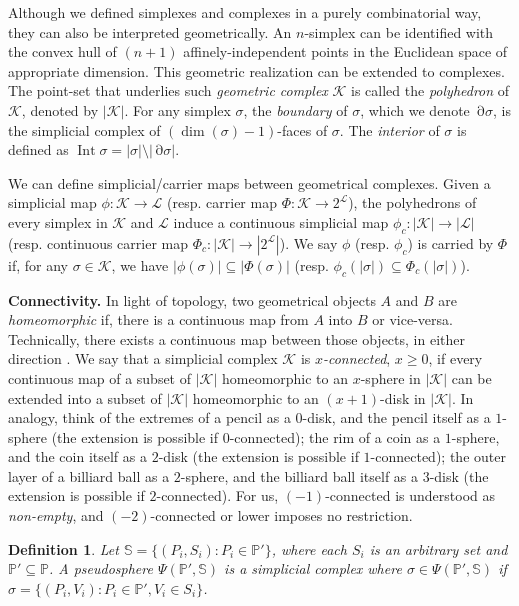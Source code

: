 \documentclass[11pt]{article}
\newcommand{\cK}{\ensuremath{\mathcal{K}}}
\newcommand{\cL}{\ensuremath{\mathcal{L}}}
\newcommand{\bbP}{\ensuremath{\mathbb{P}}}
\newcommand{\bbS}{\ensuremath{\mathbb{S}}}
\DeclareMathOperator{\Bd}{\partial}
\DeclareMathOperator{\inte}{Int}
\newtheorem{definition}[theorem]{Definition}
\newcommand{\set}[1]{\{#1\}}
\begin{document}
Although we defined simplexes and complexes in a purely combinatorial way,
they can also be interpreted geometrically.
An $n$-simplex can be identified with the convex hull of $(n+1)$
affinely-independent points in the Euclidean space of appropriate dimension.
This geometric realization can be extended to complexes.
The point-set that underlies such \emph{geometric complex} $\cK$ is called
the \emph{polyhedron} of $\cK$, denoted by $|\cK|$.
For any simplex $\sigma$, the \emph{boundary} of $\sigma$, which we denote $\Bd{\sigma}$,
is the simplicial complex of $(\dim(\sigma) - 1)$-faces of $\sigma$.
The \emph{interior} of $\sigma$ is defined as
$\inte{\sigma} = |\sigma| \setminus |\Bd{\sigma}|$.

We can define simplicial/carrier maps between geometrical complexes.
Given a simplicial map $\phi: \cK \to \cL$ (resp. carrier map $\Phi: \cK \to 2^{\cL}$),
the polyhedrons of every simplex in $\cK$ and $\cL$
induce a continuous simplicial map $\phi_c: |\cK| \to |\cL|$ (resp. continuous carrier map $\Phi_c: |\cK| \to |2^{\cL}|$).
We say $\phi$ (resp. $\phi_c$) is carried by $\Phi$
if, for any $\sigma \in \cK$,
we have $|\phi(\sigma)| \subseteq |\Phi(\sigma)|$ (resp. $\phi_c(|\sigma|) \subseteq \Phi_c(|\sigma|)$).



\textbf{Connectivity.} 
In light of topology,
two geometrical objects $A$ and $B$ are \emph{homeomorphic} if,
there is a continuous map from $A$ into $B$ or vice-versa.
Technically,
there exists a continuous map between those objects, in either direction \cite{Munkres00,Munkres84}.
We say that a simplicial complex $\cK$
is \emph{$x$-connected}, $x \ge 0$,
if every continuous map
of a subset of $|\cK|$ homeomorphic to an $x$-sphere in $|\cK|$
can be extended into
a subset of $|\cK|$ homeomorphic to an $(x+1)$-disk in $|\cK|$.
In analogy,
think of the extremes of a pencil as a $0$-disk,
and the pencil itself as a $1$-sphere (the extension is possible if $0$-connected);
the rim of a coin as a $1$-sphere,
and the coin itself as a $2$-disk (the extension is possible if $1$-connected);
the outer layer of a billiard ball as a $2$-sphere,
and the billiard ball itself as a $3$-disk (the extension is possible if $2$-connected).
For us,
$(-1)$-connected is understood as \emph{non-empty},
and $(-2)$-connected or lower imposes no restriction.



\begin{definition}
\label{definition-pseudosphere}
Let $\bbS = \set{(P_i,S_i): P_i \in \bbP'}$,
where each $S_i$ is an arbitrary set and $\bbP' \subseteq \bbP$.
A \emph{pseudosphere} $\Psi(\bbP', \bbS)$ is a simplicial complex where
$\sigma \in \Psi(\bbP', \bbS)$ if
$\sigma = \set{(P_i,V_i): P_i \in \bbP', V_i \in S_i}$.
\end{definition}
\end{document}
